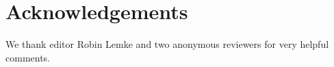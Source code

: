 \documentclass[output=paper,colorlinks,citecolor=brown]{langscibook}
\begin{document}
\section*{Acknowledgements}
We thank editor Robin Lemke and two anonymous reviewers for very helpful comments.


\sloppy
\printbibliography[heading=subbibliography,notkeyword=this]
\end{document}
